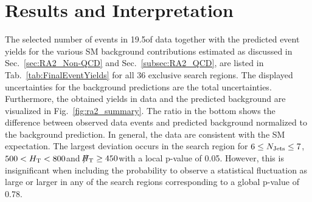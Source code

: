 \section{Results and Interpretation}
\label{sec:RA2_results}
The selected number of events in 19.5\fbinv of data together with the predicted event yields for the various SM background contributions estimated as discussed in Sec.~\ref{sec:RA2_Non-QCD} and Sec.~\ref{subsec:RA2_QCD}, are listed in Tab.~\ref{tab:FinalEventYields} for all 36 exclusive search regions. The displayed uncertainties for the background predictions are the total uncertainties. Furthermore, the obtained yields in data and the predicted background are visualized in Fig.~\ref{fig:ra2_summary}. The ratio in the bottom shows the difference between observed data events and predicted background normalized to the background prediction. In general, the data are consistent with the SM expectation. The largest deviation occurs in the search region for $6 \leq N_{\text{Jets}} \leq 7$, $500 < H_{\text{T}} < 800$\gev and $\slash\mkern-12mu{H}_{\text{T}} \ge 450$\gev with a local p-value of 0.05. However, this is insignificant when including the probability to observe a statistical fluctuation as large or larger in any of the search regions corresponding to a global p-value of 0.78. 
